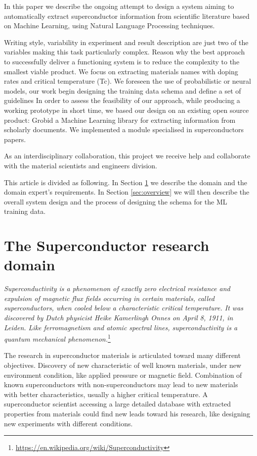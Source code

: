 \documentclass{article}
\begin{document}
In this paper we describe the ongoing attempt to design a system aiming to automatically extract superconductor information from scientific literature based on Machine Learning, using Natural Language Processing techniques.

Writing style, variability in experiment and result description are just two of the variables making this task particularly complex. Reason why the best approach to successfully deliver a functioning system is to reduce the complexity to the smallest viable product.
We focus on extracting materials names with doping rates and critical temperature (Tc). We foreseen the use of probabilistic or neural models, our work begin designing the training data schema and define a set of guidelines \cite{article} 
In order to assess the feasibility of our approach, while producing a working prototype in short time, we based our design on an existing open source product: Grobid \cite{GROBID} \cite{lopez2009grobid} a Machine Learning library for extracting information from scholarly documents. We implemented a module specialised in superconductors papers.

As an interdisciplinary collaboration, this project we receive help and collaborate with the material scientists and engineers division. 

This article is divided as following. In Section \ref{sec:requirements} we describe the domain and the domain expert's requirements. In Section \ref{sec:overview} we will then describe the overall system design and the process of designing the schema for the ML training data. 

\section{The Superconductor research domain}
\label{sec:requirements}

\textit{Superconductivity is a phenomenon of exactly zero electrical resistance and expulsion of magnetic flux fields occurring in certain materials, called superconductors, when cooled below a characteristic critical temperature. It was discovered by Dutch physicist Heike Kamerlingh Onnes on April 8, 1911, in Leiden. Like ferromagnetism and atomic spectral lines, superconductivity is a quantum mechanical phenomenon.}\footnote{\url{https://en.wikipedia.org/wiki/Superconductivity}}

The research in superconductor materials is articulated toward many different objectives. Discovery of new characteristic of well known materials, under new environment condition, like applied pressure or magnetic field. Combination of known superconductors with non-superconductors may lead to new materials with better characteristics, usually a higher critical temperature. A superconductor scientist accessing a large detailed database with extracted properties from materials could find new leads toward his research, like designing new experiments with different conditions. 
\end{document}
